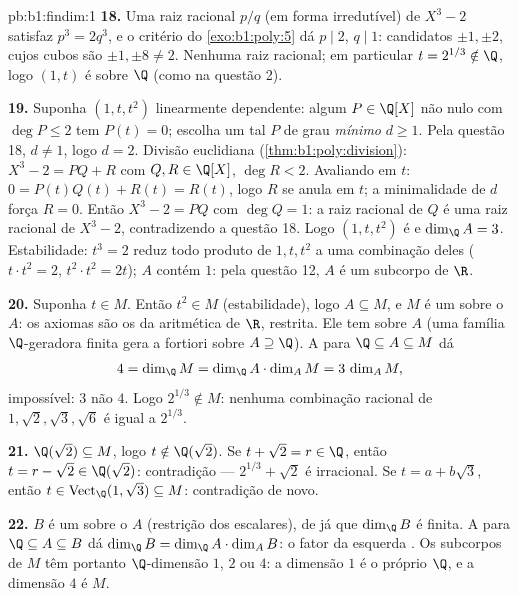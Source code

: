\begin{solution}{pb:b1:findim:1}
\textbf{18.} Uma raiz racional $p/q$ (em forma irredutível) de
$X^3 - 2$ satisfaz $p^3 = 2q^3$, e o critério do \cref{exo:b1:poly:5} dá $p \mid 2$, $q \mid 1$:
candidatos $\pm1, \pm2$, cujos cubos são $\pm1, \pm8 \neq 2$. Nenhuma raiz racional;
em particular $t = 2^{1/3} \notin \Q$, logo $(1, t)$ é  sobre $\Q$ (como na
questão 2).

\textbf{19.} Suponha $(1, t, t^2)$ linearmente dependente: algum $P \in
\Q[X]$
não nulo com $\deg P \leq 2$ tem $P(t) = 0$; escolha um tal $P$ de grau
\emph{mínimo} $d \geq 1$. Pela questão 18, $d \neq 1$, logo $d = 2$. Divisão
euclidiana (\cref{thm:b1:poly:division}): $X^3 - 2
= PQ + R$ com $Q, R \in \Q[X]$, $\deg R < 2$. Avaliando em $t$:
$0 = P(t)Q(t) + R(t) = R(t)$, logo $R$ se anula em $t$; a minimalidade de $d$ força
$R = 0$. Então $X^3 - 2 = PQ$ com $\deg Q = 1$: a raiz racional de $Q$ é uma
raiz racional de $X^3 - 2$, contradizendo a questão 18. Logo
$(1, t, t^2)$ é  e $\dim_\Q A = 3$. Estabilidade: $t^3 = 2$ reduz todo
produto de $1, t, t^2$ a uma combinação deles ($t\cdot t^2 = 2$, $t^2\cdot
t^2 = 2t$); $A$
contém $1$: pela questão 12, $A$ é um subcorpo de $\R$.

\textbf{20.} Suponha $t \in M$. Então $t^2 \in M$ (estabilidade), logo
$A \subseteq M$, e $M$ é um  sobre o  $A$: os axiomas
são os da aritmética de $\R$, restrita. Ele tem 
sobre $A$ (uma família $\Q$-geradora finita gera a fortiori sobre
$A \supseteq \Q$). A  para $\Q \subseteq A \subseteq M$ dá
\[
4 = \dim_\Q M = \dim_\Q A \cdot \dim_A M = 3\,\dim_A M ,
\]
impossível: $3$ não  $4$. Logo $2^{1/3} \notin M$: nenhuma combinação
racional de $1, \sqrt2, \sqrt3, \sqrt6$ é igual a $2^{1/3}$.

\textbf{21.} $\Q(\sqrt2) \subseteq M$, logo $t \notin \Q(\sqrt2)$. Se $t + \sqrt2 = r \in \Q$, então $t = r - \sqrt2 \in \Q(\sqrt2)$:
contradição --- $2^{1/3} + \sqrt2$ é irracional. Se $t = a +
b\sqrt3$, então $t \in \operatorname{Vect}_\Q(1, \sqrt3) \subseteq
M$:
contradição de novo.

\textbf{22.} $B$ é um  sobre o  $A$
(restrição dos escalares), de  já que $\dim_\Q B$ é
finita. A  para $\Q \subseteq A \subseteq B$ dá $\dim_\Q B = \dim_\Q A \cdot \dim_A B$: o fator da esquerda
. Os subcorpos de $M$ têm portanto $\Q$-dimensão $1$, $2$
ou $4$: a dimensão $1$ é o próprio $\Q$, e a dimensão $4$ é $M$.


\end{solution}
